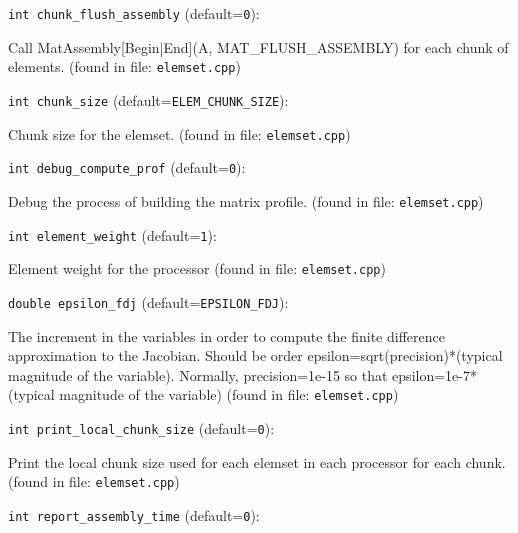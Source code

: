 \item\verb+int chunk_flush_assembly+ {\rm(default=\verb|0|)}:

Call MatAssembly[Begin|End](A, MAT_FLUSH_ASSEMBLY) for
each chunk of elements.
 (found in file: \verb+elemset.cpp+)
\item\verb+int chunk_size+ {\rm(default=\verb|ELEM_CHUNK_SIZE|)}:

Chunk size for the elemset. 
 (found in file: \verb+elemset.cpp+)
\item\verb+int debug_compute_prof+ {\rm(default=\verb|0|)}:

Debug the process of building the matrix profile. 
 (found in file: \verb+elemset.cpp+)
\item\verb+int element_weight+ {\rm(default=\verb|1|)}:

Element weight for the processor
 (found in file: \verb+elemset.cpp+)
\item\verb+double epsilon_fdj+ {\rm(default=\verb|EPSILON_FDJ|)}:

The increment in the variables in order to
compute the finite difference approximation to the
Jacobian. Should be order epsilon=sqrt(precision)*(typical
magnitude of the variable). Normally, precision=1e-15 so
that epsilon=1e-7*(typical magnitude of the
variable)
 (found in file: \verb+elemset.cpp+)
\item\verb+int print_local_chunk_size+ {\rm(default=\verb|0|)}:

Print the local chunk size used for each elemset in each
processor for each chunk. 
 (found in file: \verb+elemset.cpp+)
\item\verb+int report_assembly_time+ {\rm(default=\verb|0|)}:

